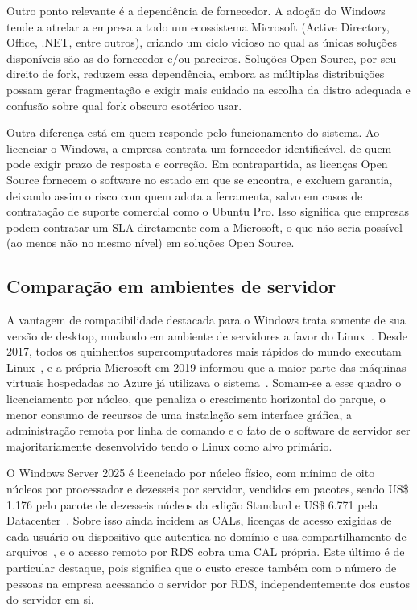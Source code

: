 Outro ponto relevante é a dependência de fornecedor. A adoção do Windows tende a atrelar a empresa a todo um ecossistema Microsoft (Active Directory, Office, .NET, entre outros), criando um ciclo vicioso no qual as únicas soluções disponíveis são as do fornecedor e/ou parceiros. Soluções Open Source, por seu direito de fork, reduzem essa dependência, embora as múltiplas distribuições possam gerar fragmentação e exigir mais cuidado na escolha da distro adequada e confusão sobre qual fork obscuro esotérico usar.

Outra diferença está em quem responde pelo funcionamento do sistema. Ao licenciar o Windows, a empresa contrata um fornecedor identificável, de quem pode exigir prazo de resposta e correção. Em contrapartida, as licenças Open Source fornecem o software no estado em que se encontra, e excluem garantia, deixando assim o risco com quem adota a ferramenta, salvo em casos de contratação de suporte comercial como o Ubuntu Pro. Isso significa que empresas podem contratar um SLA diretamente com a Microsoft, o que não seria possível (ao menos não no mesmo nível) em soluções Open Source.

\subsection{Comparação em ambientes de servidor}
A vantagem de compatibilidade destacada para o Windows trata somente de sua versão de desktop, mudando em ambiente de servidores a favor do Linux~\cite{linuxPreferedServer}. Desde 2017, todos os quinhentos supercomputadores mais rápidos do mundo executam Linux~\cite{top500Computers}, e a própria Microsoft em 2019 informou que a maior parte das máquinas virtuais hospedadas no Azure já utilizava o sistema~\cite{azureUsesLinux}. Somam-se a esse quadro o licenciamento por núcleo, que penaliza o crescimento horizontal do parque, o menor consumo de recursos de uma instalação sem interface gráfica, a administração remota por linha de comando e o fato de o software de servidor ser majoritariamente desenvolvido tendo o Linux como alvo primário.

O Windows Server 2025 é licenciado por núcleo físico, com mínimo de oito núcleos por processador e dezesseis por servidor, vendidos em pacotes, sendo US\$ 1.176 pelo pacote de dezesseis núcleos da edição Standard e US\$ 6.771 pela Datacenter~\cite{windowsServerPricing}. Sobre isso ainda incidem as CALs, licenças de acesso exigidas de cada usuário ou dispositivo que autentica no domínio e usa compartilhamento de arquivos~\cite{windowsServerPricing}, e o acesso remoto por RDS cobra uma CAL própria. Este último é de particular destaque, pois significa que o custo cresce também com o número de pessoas na empresa acessando o servidor por RDS, independentemente dos custos do servidor em si.

